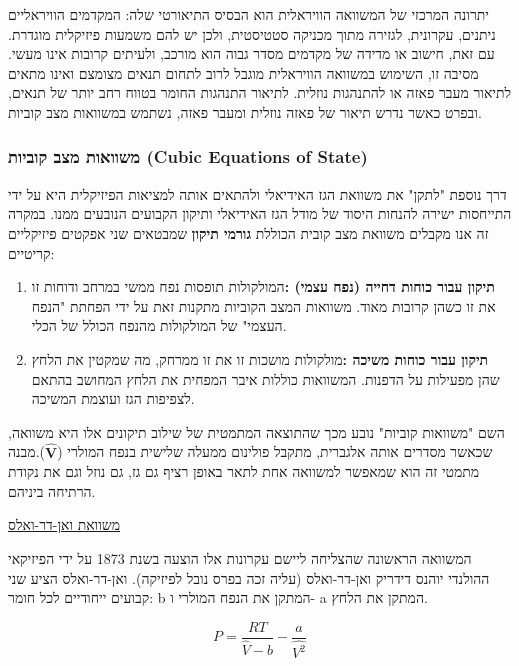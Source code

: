 \documentclass[
  hebrew,
  letterpaper,
  DIV=11,
  numbers=noendperiod]{scrreprt}
\begin{document}
יתרונה המרכזי של המשוואה הוויראלית הוא הבסיס התיאורטי שלה: המקדמים
הוויראליים ניתנים, עקרונית, לגזירה מתוך מכניקה סטטיסטית, ולכן יש להם
משמעות פיזיקלית מוגדרת. עם זאת, חישוב או מדידה של מקדמים מסדר גבוה הוא
מורכב, ולעיתים קרובות אינו מעשי. מסיבה זו, השימוש במשוואה הוויראלית
מוגבל לרוב לתחום תנאים מצומצם ואינו מתאים לתיאור מעבר פאזה או להתנהגות
נוזלית. לתיאור התנהגות החומר בטווח רחב יותר של תנאים, ובפרט כאשר נדרש
תיאור של פאזה נוזלית ומעבר פאזה, נשתמש במשוואות מצב קוביות.

\subsubsection{משוואות מצב קוביות (Cubic Equations of
State)}\label{ux5deux5e9ux5d5ux5d5ux5d0ux5d5ux5ea-ux5deux5e6ux5d1-ux5e7ux5d5ux5d1ux5d9ux5d5ux5ea-cubic-equations-of-state}

דרך נוספת "לתקן" את משוואת הגז האידיאלי ולהתאים אותה למציאות הפיזיקלית
היא על ידי התייחסות ישירה להנחות היסוד של מודל הגז האידיאלי ותיקון
הקבועים הנובעים ממנו. במקרה זה אנו מקבלים משוואת מצב קובית הכוללת
\textbf{גורמי תיקון} שמבטאים שני אפקטים פיזיקליים קריטיים:

\begin{enumerate}
\def\labelenumi{\arabic{enumi}.}
\item
  \textbf{תיקון עבור כוחות דחייה (נפח עצמי) :}המולקולות תופסות נפח ממשי
  במרחב ודוחות זו את זו כשהן קרובות מאוד. משוואות המצב הקוביות מתקנות
  זאת על ידי הפחתת "הנפח העצמי" של המולקולות מהנפח הכולל של הכלי.
\item
  \textbf{תיקון עבור כוחות משיכה :}מולקולות מושכות זו את זו ממרחק, מה
  שמקטין את הלחץ שהן מפעילות על הדפנות. המשוואות כוללות איבר המפחית את
  הלחץ המחושב בהתאם לצפיפות הגז ועוצמת המשיכה.
\end{enumerate}

השם "משוואות קוביות" נובע מכך שהתוצאה המתמטית של שילוב תיקונים אלו היא
משוואה, שכאשר מסדרים אותה אלגברית, מתקבל פולינום ממעלה שלישית בנפח
המולרי (\(\widehat{\mathbf{V}}\)).מבנה מתמטי זה הוא שמאפשר למשוואה אחת
לתאר באופן רציף גם גז, גם נוזל וגם את נקודת הרתיחה ביניהם.

\ul{משוואת ואן-דר-ואלס}

המשוואה הראשונה שהצליחה ליישם עקרונות אלו הוצעה בשנת 1873 על ידי
הפיזיקאי ההולנדי יוהנס דידריק ואן-דר-ואלס (עליה זכה בפרס נובל לפיזיקה).
ואן-דר-ואלס הציע שני קבועים ייחודיים לכל חומר: b המתקן את הנפח המולרי ו-
a המתקן את הלחץ.

\[P = \frac{RT}{\widehat{V} - b} - \frac{a}{\widehat{V^{2}}}\]
\end{document}
